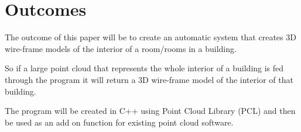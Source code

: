 

\section{Outcomes}

The outcome of this paper will be to create an automatic system that creates 3D wire-frame models of the interior of a room/rooms in a building. 

So if a large point cloud that represents the whole interior of a building is fed through the program it will return a 3D wire-frame model of the interior of that building.

The program will be created in C++ using Point Cloud Library (PCL) and then be used as an add on function for existing point cloud software.
